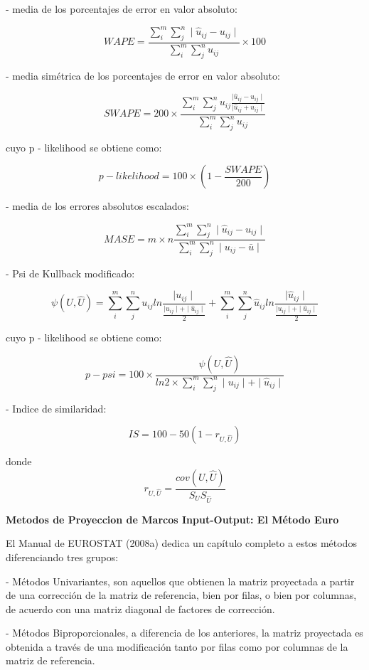 \documentclass{article}
\begin{document}
- media de los porcentajes de error en valor absoluto:

$$WAPE=\frac {\sum_i^m \sum_j^n \mid \hat u_{ij} - u_{ij}  \mid}{\sum_i^m \sum_j^n u_{ij} } \times 100$$



- media simétrica de los porcentajes de error en valor absoluto:

$$SWAPE=200 \times \frac {\sum_i^m \sum_j^n u_{ij} \frac {\mid \hat u_{ij} - u_{ij} \mid}{\mid \hat u_{ij} + u_{ij} \mid}}{\sum_i^m \sum_j^n u_{ij} }$$


cuyo p - likelihood se obtiene como:

$$p - likelihood=100 \times (1-\frac {SWAPE}{200})$$

- media de los errores absolutos escalados:

$$MASE=m \times n  \frac {\sum_i^m \sum_j^n \mid \hat u_{ij} - u_{ij}  \mid}{\sum_i^m \sum_j^n \mid  u_{ij} - \bar u \mid } $$


- Psi de Kullback modificado:

$$ \psi (U,\hat U)= \sum_i^m \sum_j^n u_{ij} ln \frac {\mid u_{ij} \mid} {\frac {\mid u_{ij} \mid + \mid \hat u_{ij} \mid}{2}} + \sum_i^m \sum_j^n \hat u_{ij} ln \frac {\mid \hat u_{ij} \mid} {\frac {\mid u_{ij} \mid + \mid \hat u_{ij} \mid}{2}} $$

cuyo p - likelihood se obtiene como:

$$ p-psi=100 \times \frac {\psi (U,\hat U)}{ln 2 \times \sum_i^m \sum_j^n \mid u_{ij} \mid + \mid \hat u_{ij}\mid}$$




- Indice de similaridad:

$$ IS=100- 50(1-r_{U,\hat U})$$

donde $$r_{U,\hat U}=\frac{cov(U,\hat U)}{S_U S_{\hat U}}$$



 {\bf Metodos de Proyeccion de Marcos Input-Output: El Método Euro}

El Manual de EUROSTAT (2008a) dedica un capítulo completo a estos métodos diferenciando tres grupos:

- Métodos Univariantes, son aquellos que obtienen la matriz proyectada a partir de una corrección de la matriz de referencia, bien por filas, o bien por columnas, de acuerdo con una matriz diagonal de factores de corrección.

- Métodos Biproporcionales, a diferencia de los anteriores, la matriz proyectada es obtenida a través de una modificación tanto por filas como por columnas de la matriz de referencia.
\end{document}
